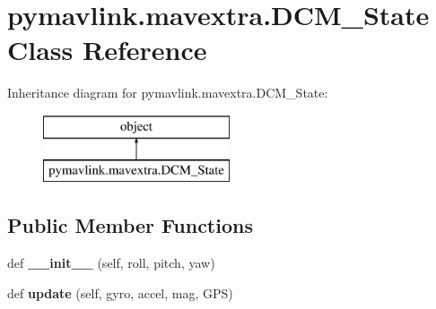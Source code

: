 \hypertarget{classpymavlink_1_1mavextra_1_1DCM__State}{}\section{pymavlink.\+mavextra.\+D\+C\+M\+\_\+\+State Class Reference}
\label{classpymavlink_1_1mavextra_1_1DCM__State}
Inheritance diagram for pymavlink.\+mavextra.\+D\+C\+M\+\_\+\+State\+:\begin{figure}[H]
\begin{center}
\leavevmode
\includegraphics[height=2.000000cm]{classpymavlink_1_1mavextra_1_1DCM__State}
\end{center}
\end{figure}
\subsection*{Public Member Functions}
\begin{DoxyCompactItemize}
\item 
\mbox{\label{classpymavlink_1_1mavextra_1_1DCM__State_a1f20ca8f9381120815f5cf1eff5d19ae}} 
def {\bfseries \+\_\+\+\_\+init\+\_\+\+\_\+} (self, roll, pitch, yaw)
\item 
\mbox{\label{classpymavlink_1_1mavextra_1_1DCM__State_a1d4bde9feb6f1b8ca501f96c914bac27}} 
def {\bfseries update} (self, gyro, accel, mag, G\+PS)
\end{DoxyCompactItemize}
